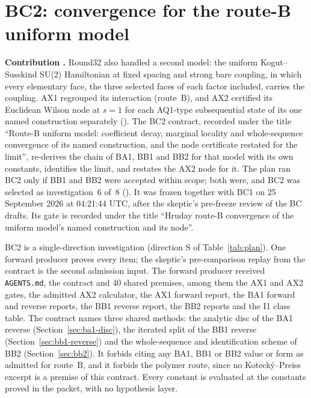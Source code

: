 \section{BC2: convergence for the route-B uniform model}
\label{sec:bc2}

\textbf{Contribution .} Round32 also handled a second
model: the uniform Kogut--Susskind SU(2) Hamiltonian at fixed spacing and
strong bare coupling, in which every elementary face, the three selected
faces of each factor included, carries the coupling. AX1 regrouped its
interaction (route~B), and AX2 certified its Euclidean Wilson node at $s=1$
for each AQ1-type subsequential state of its one named construction
separately (). The
BC2 contract, recorded under the title ``Route-B uniform model: coefficient
decay, marginal locality and whole-sequence convergence of its named
construction, and the node certificate restated for the limit'', re-derives
the chain of BA1, BB1 and BB2 for that model with its own constants,
identifies the limit, and restates the AX2 node for it. The plan ran BC2 only
if BB1 and BB2 were accepted within scope; both were, and BC2 was selected as
investigation~6 of~8
(). It was
frozen together with BC1 on 25 September 2026 at 04:21:44 UTC, after the
skeptic's pre-freeze review of the BC drafts. Its gate is recorded under the
title ``Hruday route-B convergence of the uniform model's named construction
and its node''.

BC2 is a single-direction investigation (direction S of
Table~\ref{tab:plan}). One forward producer proves every item; the skeptic's
pre-comparison replay from the contract is the second admission input. The
forward producer received \texttt{AGENTS.md}, the contract and 40 shared
premises, among them the AX1 and AX2 gates, the admitted AX2 calculator, the
AX1 forward report, the BA1 forward and reverse reports, the BB1 reverse
report, the BB2 reports and the I1 class table. The contract names three
shared methods: the analytic disc of the BA1 reverse
(Section~\ref{sec:ba1-disc}), the iterated split of the BB1 reverse
(Section~\ref{sec:bb1-reverse}) and the whole-sequence and identification
scheme of BB2 (Section~\ref{sec:bb2}). It forbids citing any BA1, BB1 or BB2
value or form as admitted for route~B, and it forbids the polymer route,
since no Kotecký--Preiss excerpt is a premise of this contract. Every constant
is evaluated at the constants proved in the packet, with no hypothesis layer.

